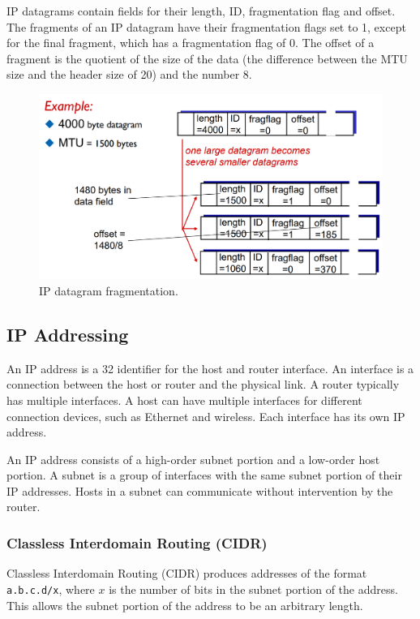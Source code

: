 IP datagrams contain fields for their length, ID, fragmentation flag and offset.
The fragments of an IP datagram have their fragmentation flags set to \num{1}, except for the final fragment, which has a fragmentation flag of \num{0}.
The offset of a fragment is the quotient of the size of the data (the difference between the MTU size and the header size of \SI{20}{\byte}) and the number \num{8}.

\begin{figure}[htp]
  \centering
  \includegraphics[width=15cm]{unit-19/figures/fragmentation.png}
  \caption*{IP datagram fragmentation.}
\end{figure}

\subsection{IP Addressing}

An IP address is a \SI{32}{\bit} identifier for the host and router interface.
An interface is a connection between the host or router and the physical link.
A router typically has multiple interfaces.
A host can have multiple interfaces for different connection devices, such as Ethernet and wireless.
Each interface has its own IP address.

An IP address consists of a high-order subnet portion and a low-order host portion.
A subnet is a group of interfaces with the same subnet portion of their IP addresses.
Hosts in a subnet can communicate without intervention by the router.

\subsubsection{Classless Interdomain Routing (CIDR)}

Classless Interdomain Routing (CIDR) produces addresses of the format \texttt{a.b.c.d/x}, where \(x\) is the number of bits in the subnet portion of the address.
This allows the subnet portion of the address to be an arbitrary length.

